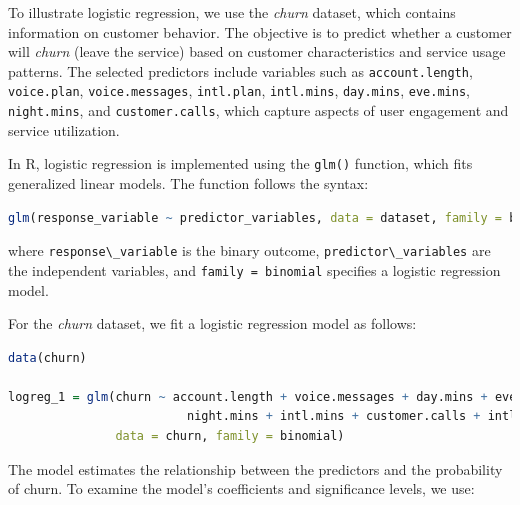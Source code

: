 \documentclass[
  11pt,
]{book}
\newcommand{\passthrough}[1]{#1}
\theoremstyle{definition}
\theoremstyle{definition}
\theoremstyle{definition}
\theoremstyle{definition}
\theoremstyle{remark}
\begin{document}
To illustrate logistic regression, we use the \emph{churn} dataset, which contains information on customer behavior. The objective is to predict whether a customer will \emph{churn} (leave the service) based on customer characteristics and service usage patterns. The selected predictors include variables such as \passthrough{\lstinline!account.length!}, \passthrough{\lstinline!voice.plan!}, \passthrough{\lstinline!voice.messages!}, \passthrough{\lstinline!intl.plan!}, \passthrough{\lstinline!intl.mins!}, \passthrough{\lstinline!day.mins!}, \passthrough{\lstinline!eve.mins!}, \passthrough{\lstinline!night.mins!}, and \passthrough{\lstinline!customer.calls!}, which capture aspects of user engagement and service utilization.

In R, logistic regression is implemented using the \passthrough{\lstinline!glm()!} function, which fits generalized linear models. The function follows the syntax:

\begin{lstlisting}[language=R]
glm(response_variable ~ predictor_variables, data = dataset, family = binomial)
\end{lstlisting}

where \passthrough{\lstinline!response\_variable!} is the binary outcome, \passthrough{\lstinline!predictor\_variables!} are the independent variables, and \passthrough{\lstinline!family = binomial!} specifies a logistic regression model.

For the \emph{churn} dataset, we fit a logistic regression model as follows:

\begin{lstlisting}[language=R]
data(churn)

logreg_1 = glm(churn ~ account.length + voice.messages + day.mins + eve.mins + 
                         night.mins + intl.mins + customer.calls + intl.plan + voice.plan, 
               data = churn, family = binomial)
\end{lstlisting}

The model estimates the relationship between the predictors and the probability of churn. To examine the model's coefficients and significance levels, we use:
\end{document}
